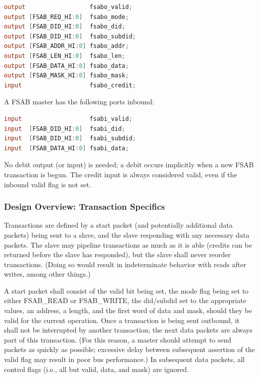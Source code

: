 \documentclass[10pt]{article}
\begin{document}
\begin{lstlisting}[basicstyle=\footnotesize,language=Verilog]
output                  fsabo_valid;
output [FSAB_REQ_HI:0]  fsabo_mode;
output [FSAB_DID_HI:0]  fsabo_did;
output [FSAB_DID_HI:0]  fsabo_subdid;
output [FSAB_ADDR_HI:0] fsabo_addr;
output [FSAB_LEN_HI:0]  fsabo_len;
output [FSAB_DATA_HI:0] fsabo_data;
output [FSAB_MASK_HI:0] fsabo_mask;
input                   fsabo_credit;
\end{lstlisting}

A FSAB master has the following ports inbound:

\begin{lstlisting}[basicstyle=\footnotesize,language=Verilog]
input                   fsabi_valid;
input  [FSAB_DID_HI:0]  fsabi_did;
input  [FSAB_DID_HI:0]  fsabi_subdid;
input  [FSAB_DATA_HI:0] fsabi_data;
\end{lstlisting}

No debit output (or input) is needed; a debit occurs implicitly when a new
FSAB transaction is begun. The credit input is always considered valid, even
if the inbound valid flag is not set.

\subsubsection{Design Overview: Transaction Specifics}

Transactions are defined by a start packet (and potentially additional data
packets) being sent to a slave, and the slave responding with any necessary
data packets. The slave may pipeline transactions as much as it is able
(credits can be returned before the slave has responded), but the slave
shall never reorder transactions. (Doing so would result in indeterminate
behavior with reads after writes, among other things.)

A start packet shall consist of the valid bit being set, the mode flag being
set to either FSAB\_READ or FSAB\_WRITE, the did/subdid set to the appropriate
values, an address, a length, and the first word of data and mask, should
they be valid for the current operation. Once a transaction is being sent
outbound, it shall not be interrupted by another transaction; the next data
packets are always part of this transaction. (For this reason, a master
should attempt to send packets as quickly as possible; excessive delay
between subsequent assertion of the valid flag may result in poor bus
performance.) In subsequent data packets, all control flags (i.e., all but
valid, data, and mask) are ignored.
\end{document}
